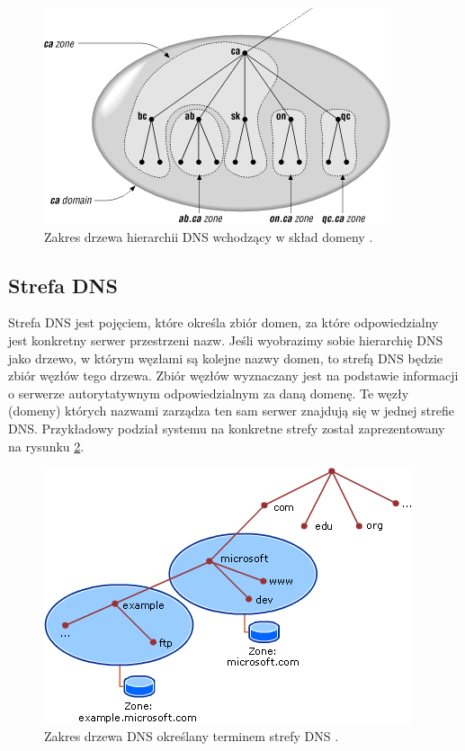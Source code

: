 \begin{center}
	\begin{figure}
	\includegraphics[scale=0.8]{image/domain_example}
	\caption{Zakres drzewa hierarchii DNS wchodzący w skład domeny \cite{domain_example}.}
	\label{fig:domain_dns_example}
	\end{figure}
\end{center}

\subsection{Strefa DNS}
\noindent Strefa DNS jest pojęciem, które określa zbiór domen, za które odpowiedzialny jest konkretny serwer przestrzeni nazw. Jeśli wyobrazimy
sobie hierarchię DNS jako drzewo, w którym węzłami są kolejne nazwy domen, to strefą DNS będzie zbiór węzłów tego drzewa. Zbiór
węzłów wyznaczany jest na podstawie informacji o serwerze autorytatywnym odpowiedzialnym za daną domenę. Te węzły (domeny)
których nazwami zarządza ten sam serwer znajdują się w jednej strefie DNS. Przykładowy podział systemu na konkretne strefy został
zaprezentowany na rysunku \ref{fig:dns_zone_example}.

\begin{center}
	\begin{figure}
	\includegraphics[scale=0.8]{image/zone_example}
	\caption{Zakres drzewa DNS określany terminem strefy DNS \cite{zone_example}.}
	\label{fig:dns_zone_example}
	\end{figure}
\end{center}

